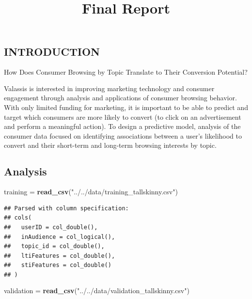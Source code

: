 \documentclass[]{article}
\title{Final Report}
\author{}
\date{}
\newenvironment{Shaded}{\begin{snugshade}}{\end{snugshade}}
\newcommand{\KeywordTok}[1]{\textcolor[rgb]{0.13,0.29,0.53}{\textbf{#1}}}
\newcommand{\NormalTok}[1]{#1}
\newcommand{\StringTok}[1]{\textcolor[rgb]{0.31,0.60,0.02}{#1}}
\begin{document}
\maketitle

\hypertarget{introduction}{%
\subsection{INTRODUCTION}\label{introduction}}

How Does Consumer Browsing by Topic Translate to Their Conversion
Potential?

Valassis is interested in improving marketing technology and consumer
engagement through analysis and applications of consumer browsing
behavior. With only limited funding for marketing, it is important to be
able to predict and target which consumers are more likely to convert
(to click on an advertisement and perform a meaningful action). To
design a predictive model, analysis of the consumer data focused on
identifying associations between a user's likelihood to convert and
their short-term and long-term browsing interests by topic.

\hypertarget{analysis}{%
\subsection{Analysis}\label{analysis}}

\begin{Shaded}
\begin{Highlighting}[]
\NormalTok{training =}\StringTok{ }\KeywordTok{read_csv}\NormalTok{(}\StringTok{"../../data/training_tallskinny.csv"}\NormalTok{)}
\end{Highlighting}
\end{Shaded}

\begin{verbatim}
## Parsed with column specification:
## cols(
##   userID = col_double(),
##   inAudience = col_logical(),
##   topic_id = col_double(),
##   ltiFeatures = col_double(),
##   stiFeatures = col_double()
## )
\end{verbatim}

\begin{Shaded}
\begin{Highlighting}[]
\NormalTok{validation =}\StringTok{ }\KeywordTok{read_csv}\NormalTok{(}\StringTok{"../../data/validation_tallskinny.csv"}\NormalTok{)}
\end{Highlighting}
\end{Shaded}
\end{document}
